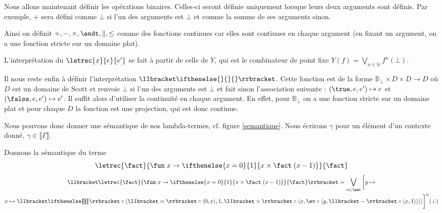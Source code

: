 Nous allons maintenant définir les opérations binaires. Celles-ci seront définie uniquement lorsque leurs deux arguments sont définis. Par exemple, $+$ sera défini comme $\bot$ si l'un des arguments est $\bot$ et comme la somme de ses arguments sinon.

Ainsi on définit $+,-,\times,\andt,\|,\leq$ comme des fonctions continues car elles sont continues en chaque argument (en fixant un argument, on a une fonction stricte sur un domaine plat).

L'interprétation du $\letrec{x}{e}{e'}$ se fait à partir de celle de $Y$, qui est le combinateur de point fixe $Y(f) =\displaystyle{\bigvee_{n\in\mathbb N} f^n(\bot)}$.

Il nous reste enfin à définir l'interprétation $\llbracket\ifthenelse{}{}{}\rrbracket$. Cette fonction est de la forme $\mathbb B_\bot \times D\times D \to D$ où $D$ est un domaine de Scott et renvoie $\bot$ si l'un des arguments est $\bot$ et fait sinon l'association suivante : $(\true,e,e')\mapsto e$ et $(\false,e,e')\mapsto e'$. Il suffit alors d'utiliser la continuité en chaque argument. En effet, pour $\mathbb B_\bot$ on a une fonction stricte sur un domaine plat et pour chaque $D$ la fonction est une projection, qui est donc continue.

Nous pouvons donc donner une sémantique de nos lambda-termes, cf. figure \ref{semantique}. Nous écrirons $\gamma$ pour un élément d'un contexte donné, $\gamma\in\llbracket\Gamma\rrbracket$.

\begin{expl}
    Donnons la sémantique du terme $$\letrec{\fact}{\fun\;x\to\ifthenelse{x=0}{1}{x\times \fact\;(x-1)}}{\fact}$$
    \begin{multline*}
        \llbracket\letrec{\fact}{\fun\;x\to\ifthenelse{x=0}{1}{x\times \fact\;(x-1)}}{\fact}\rrbracket = \bigvee_{n\in\nat}\bigg[ g\mapsto\\ x\mapsto \llbracket\ifthenelse{\!\!\!}{\!\!\!\!}{\!\!\!}\rrbracket \circ \langle \llbracket=\rrbracket\circ \langle 0,x\rangle, 1, \llbracket\times\rrbracket \circ\langle x,\ev\circ\langle g,\llbracket -\rrbracket\circ\langle x,1\rangle\rangle\rangle\rangle\bigg]^n(\bot)
    \end{multline*}
\end{expl}

